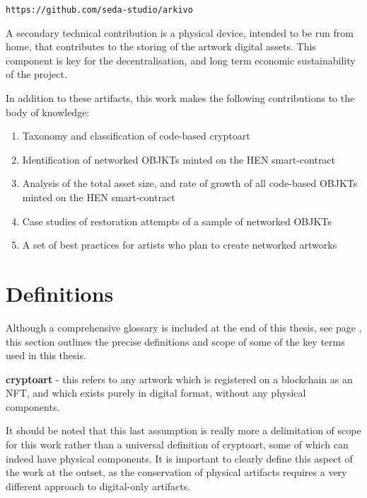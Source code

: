 \texttt{https://github.com/seda-studio/arkivo}

\vspace{0.5cm}

A secondary technical contribution is a physical device, intended to be run from home, that contributes to the storing of the artwork digital assets. This component is key for the decentralisation, and long term economic sustainability of the project. 

\vspace{0.5cm}

In addition to these artifacts, this work makes the following contributions to the body of knowledge:

\begin{enumerate}
    \item Taxonomy and classification of code-based cryptoart
    \item Identification of networked OBJKTs minted on the HEN smart-contract
    \item Analysis of the total asset size, and rate of growth of all code-based OBJKTs minted on the HEN smart-contract
    \item Case studies of restoration attempts of a sample of networked OBJKTs
    \item A set of best practices for artists who plan to create networked artworks
\end{enumerate}


\section{Definitions}
\label{sec:definitions}

Although a comprehensive glossary is included at the end of this thesis, see page \pageref{sec:glossary}, this section outlines the precise definitions and scope of some of the key terms used in this thesis.

\vspace{0.5cm}

\textbf{cryptoart} - this refers to any artwork which is registered on a blockchain as an NFT, and which exists purely in digital format, without any physical components.

It should be noted that this last assumption is really more a delimitation of scope for this work rather than a universal definition of cryptoart, some of which can indeed have physical components. It is important to clearly define this aspect of the work at the outset, as the conservation of physical artifacts requires a very different approach to digital-only artifacts.

